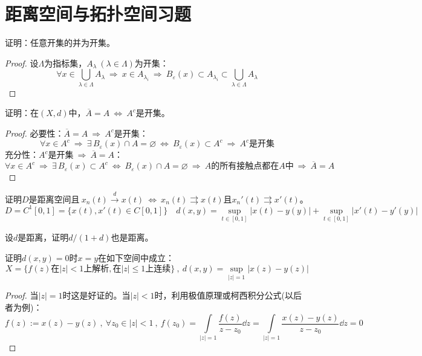 \section*{距离空间与拓扑空间习题}
\begin{example}
\quad 证明：任意开集的并为开集。
\end{example}
\begin{proof}
设$\Lambda$为指标集，$A_{\lambda} \ (\lambda \in \Lambda)$为开集：
\[\forall x \in \bigcup_{\lambda \in \Lambda}A_{\lambda} \ \Rightarrow \ x \in A_{\lambda_i} \ \Rightarrow \ B_{\varepsilon}(x) \subset A_{\lambda_i} \subset \bigcup_{\lambda \in \Lambda}A_{\lambda}\]
\end{proof}

\begin{example}
\quad 证明：在$(X,d)$中，$\overline{A}=A \ \Leftrightarrow \ A^c$是开集。
\end{example}
\begin{proof}必要性：$\overline{A}=A \ \Rightarrow \ A^c$是开集：
\[\forall x \in A^c \ \Rightarrow \ \exists \, B_{\varepsilon}(x) \cap A=\varnothing \ \Leftrightarrow \ B_{\varepsilon}(x) \subset A^c \ \Rightarrow \ A^c\text{是开集}\]
充分性：$A^c$是开集$ \ \Rightarrow \ \overline{A}=A$：
\[\forall x \in A^c \ \Rightarrow \ \exists \, B_{\varepsilon}(x) \subset A^c \ \Leftrightarrow \ B_{\varepsilon}(x) \cap A=\varnothing \ \Rightarrow \ A\text{的所有接触点都在$A$中} \ \Rightarrow \ \overline{A}=A\]
\end{proof}

\begin{example}
\quad 证明$D$是距离空间且$\ x_n(t) \xrightarrow{d} x(t) \ \Leftrightarrow \ x_n(t) \rightrightarrows x(t)\text{且}x_n'(t) \rightrightarrows x'(t)$。
\[D=C^1[0,1]=\{x(t),x'(t) \in C[0,1]\} \quad d(x,y)=\mathop \text{sup}\limits_{t \in [0,1]}|x(t)-y(y)|+\mathop \text{sup}\limits_{t \in [0,1]}|x'(t)-y'(y)|\]
\end{example}

\begin{example}
\quad 设$d$是距离，证明$d/(1+d)$也是距离。
\end{example}

\begin{example}
\quad 证明$d(x,y)=0$时$x=y$在如下空间中成立：
\[X=\{f(z)\text{在}|z|<1\text{上解析},\text{在}|z| \leq 1\text{上连续}\} \ , \ d(x,y)=\mathop \text{sup}\limits_{|z|=1}|x(z)-y(z)|\]
\end{example}
\begin{proof}
当$|z|=1$时这是好证的。当$|z|<1$时，利用极值原理或柯西积分公式(以后者为例)：
\[f(z):=x(z)-y(z) \ , \ \forall z_0 \in |z|<1 \ , \ f(z_0)=\int\limits_{|z|=1}\frac{f(z)}{z-z_0}\dd z=\int\limits_{|z|=1}\frac{x(z)-y(z)}{z-z_0}\dd z=0\]
\end{proof}


